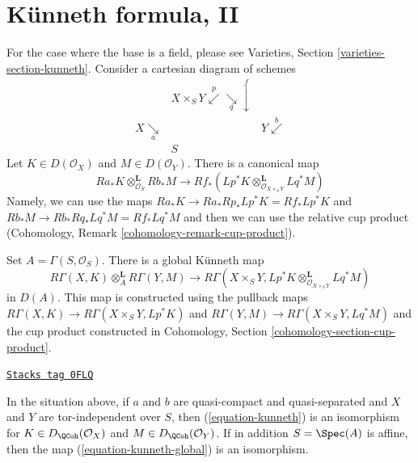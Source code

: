 \section{K\"unneth formula, II}
\label{perfect-section-kunneth}
For the case where the base is a field, please see
Varieties, Section \ref{varieties-section-kunneth}.
Consider a cartesian diagram of schemes
$$
\begin{array}{ccc} & X \times_S Y \overset{p}{\swarrow}\underset{q}{\searrow}\overset{f}{\downarrow} &  \\ X \underset{a}{\searrow} &  & Y \overset{b}{\swarrow} \\  & S & \end{array}
$$
Let $K \in D(\mathcal{O}_X)$ and $M \in D(\mathcal{O}_Y)$.
There is a canonical map
\begin{equation}
\label{equation-kunneth}
Ra_*K \otimes_{\mathcal{O}_S}^\mathbf{L} Rb_*M
\longrightarrow
Rf_*(Lp^*K \otimes_{\mathcal{O}_{X \times_S Y}}^\mathbf{L} Lq^*M)
\end{equation}
Namely, we can use the maps
$Ra_*K \to Ra_*Rp_* Lp^*K = Rf_*Lp^*K$ and
$Rb_*M \to Rb_*Rq_* Lq^*M = Rf_*Lq^*M$ and then we can use the
relative cup product (Cohomology, Remark \ref{cohomology-remark-cup-product}).

\medskip\noindent
Set $A = \Gamma(S, \mathcal{O}_S)$. There is a global K\"unneth map
\begin{equation}
\label{equation-kunneth-global}
R\Gamma(X, K) \otimes_A^\mathbf{L} R\Gamma(Y, M)
\longrightarrow
R\Gamma(X \times_S Y,
Lp^*K \otimes_{\mathcal{O}_{X \times_S Y}}^\mathbf{L} Lq^*M)
\end{equation}
in $D(A)$. This map is constructed using the pullback maps
$R\Gamma(X, K) \to R\Gamma(X \times_S Y, Lp^*K)$ and
$R\Gamma(Y, M) \to R\Gamma(X \times_S Y, Lq^*M)$ and
the cup product constructed in
Cohomology, Section \ref{cohomology-section-cup-product}.

\begin{lemma}[Kunneth]
\label{perfect-lemma-kunneth}
\href{https://stacks.math.columbia.edu/tag/0FLQ}{\texttt{Stacks tag 0FLQ}}

In the situation above, if $a$ and $b$ are quasi-compact and quasi-separated
and $X$ and $Y$ are tor-independent over $S$, then (\ref{equation-kunneth})
is an isomorphism for $K \in D_\QCoh(\mathcal{O}_X)$ and
$M \in D_\QCoh(\mathcal{O}_Y)$. If in addition $S = \Spec(A)$ is affine,
then the map (\ref{equation-kunneth-global}) is an isomorphism.
\end{lemma}

